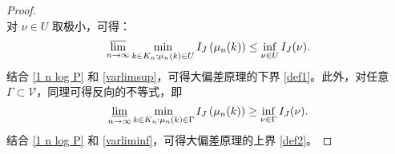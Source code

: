 \begin{proof}
\begin{equation*}
\end{equation*}
对 $\nu\in U$ 取极小，可得：
\begin{equation}\label{varlimsup}
\varlimsup_{n\to\infty}\min_{k\in K_n: \mu_n(k) \in U}I_J\left(\mu_{n}(k)\right)\le \inf_{\nu\in U}I_J(\nu).
\end{equation}
结合 \eqref{1 n log P} 和 \eqref{varlimsup}，可得大偏差原理的下界 \eqref{def1}。此外，对任意$\Gamma \subset \mathcal{V}$，同理可得反向的不等式，即
\begin{equation}\label{varliminf}
\varliminf_{n\to\infty}\min_{k\in K_n: \mu_n(k) \in \Gamma}I_J\left(\mu_{n}(k)\right)\ge \inf_{\nu\in \Gamma}I_J(\nu).
\end{equation}
结合 \eqref{1 n log P} 和 \eqref{varliminf}，可得大偏差原理的上界 \eqref{def2}。
\end{proof}


